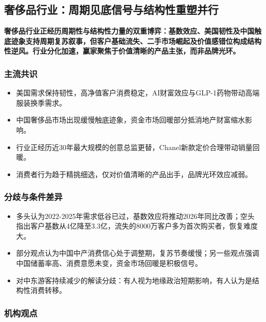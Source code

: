 \documentclass[11pt]{ctexart}
\begin{document}
\subsection{奢侈品行业：周期见底信号与结构性重塑并行}
\textbf{奢侈品行业正经历周期性与结构性力量的双重博弈：基数效应、美国韧性及中国触底迹象支持周期复苏叙事，但客户基础流失、二手市场崛起及价值感错位构成结构性逆风。行业分化加速，赢家聚焦于价值清晰的产品主张，而非品牌光环。}
\subsubsection*{主流共识}
\begin{itemize}
  \item 美国需求保持韧性，高净值客户消费稳定，AI财富效应与GLP-1药物带动高端服装换季需求。
  \item 中国奢侈品市场出现缓慢触底迹象，资金市场回暖部分抵消地产财富缩水影响。
  \item 行业正经历近30年最大规模的创意总监更替，Chanel新款定价合理带动销量回暖。
  \item 消费者行为趋于精挑细选，仅对价值清晰的产品出手，品牌光环效应减弱。
\end{itemize}
\subsubsection*{分歧与条件差异}
\begin{itemize}
  \item 多头认为2022-2025年需求低谷已过，基数效应将推动2026年同比改善；空头指出客户基数从4亿降至3.3亿，流失的8000万客户多为首次购买者，恢复难度大。
  \item 部分观点认为中国中产消费信心处于调整期，复苏节奏缓慢；另一些观点强调中国储蓄率高、消费意愿未变，资金市场回暖是积极信号。
  \item 对中东游客持续减少的解读分歧：有人视为地缘政治短期影响，有人认为是结构性消费转移。
\end{itemize}
\subsubsection*{机构观点}
\end{document}
